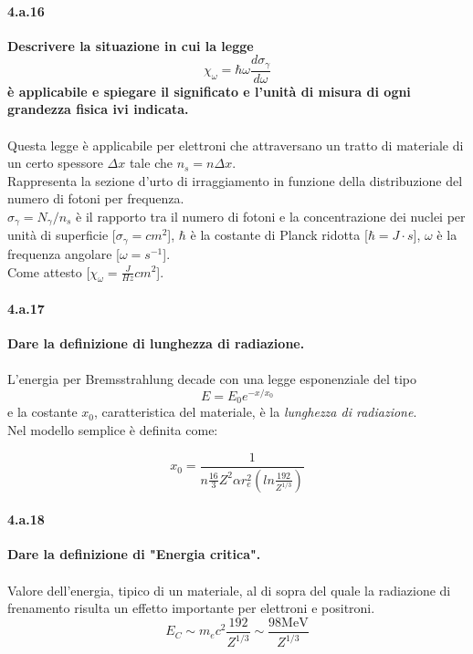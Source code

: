 \documentclass[twoside]{article}
\begin{document}
\paragraph{4.a.16}\textbf{Descrivere la situazione in cui la legge
\begin{equation}
    \chi_{\omega}=\hbar \omega \frac{d\sigma_{\gamma}}{d\omega}
\end{equation}
è applicabile e spiegare il
significato e l'unità di misura di ogni grandezza fisica ivi indicata.
}\\ \\

Questa legge è applicabile per elettroni che attraversano un tratto di materiale di un certo spessore $\Delta x$ tale che $n_s=n \Delta x$.
\\
Rappresenta la sezione d'urto di irraggiamento in funzione della distribuzione del numero di fotoni per frequenza.
\\
$\sigma_{\gamma}=N_{\gamma}/n_s$ è il rapporto tra il numero di fotoni e la concentrazione dei nuclei per unità di superficie [$\sigma_{\gamma}=cm^{2}$], $\hbar$ è la costante di Planck ridotta [$\hbar=J\cdot s$], $\omega$ è la frequenza angolare [$\omega=s^{-1}$].
\\
Come attesto [$\chi_{\omega}=\frac{J}{Hz}cm^2$].


\paragraph{4.a.17}\textbf{Dare la definizione di lunghezza di radiazione.}\\ \\
L'energia per Bremsstrahlung decade con una legge esponenziale del tipo
\begin{equation}
    E=E_0 e^{-x/x_0}
\end{equation}
e la costante $x_0$, caratteristica del materiale, è la \textit{lunghezza di radiazione}.
\\
Nel modello semplice è definita come:

\begin{equation}
    x_0=\frac{1}{n\frac{16}{3}Z^2\alpha r_e^2 \left( ln\frac{192}{Z^{1/3}}\right)}
\end{equation}

\paragraph{4.a.18}\textbf{Dare la definizione di "Energia critica".
}\\ \\
Valore dell'energia, tipico di un materiale, al di sopra del quale la radiazione di frenamento risulta un effetto importante per elettroni e positroni.
\begin{equation}
    E_C\sim m_e c^2 \frac{192}{Z^{1/3}}\sim \frac{98 \text{MeV}}{Z^{1/3}}
\end{equation}
\end{document}
